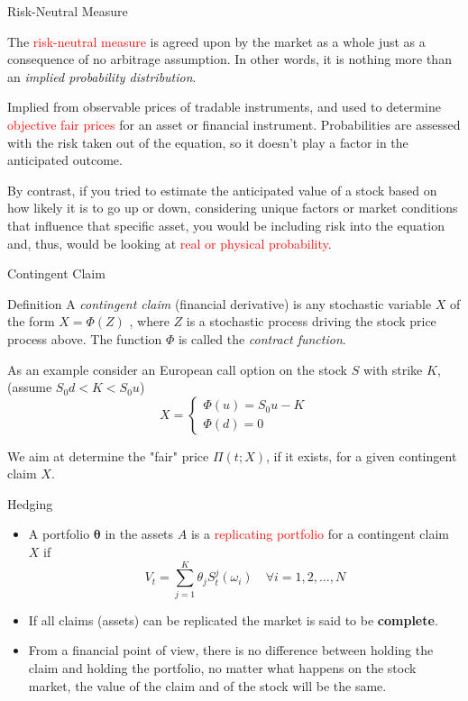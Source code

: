 \documentclass{beamer}
\begin{document}
\begin{frame}{Risk-Neutral Measure}

The \textcolor{red}{risk-neutral measure} is agreed upon by the market as a whole just as a consequence of no arbitrage assumption.
In other words, it is nothing more than an \emph{implied probability distribution}.

Implied from observable prices of tradable instruments, and used to determine \textcolor{red}{objective fair prices} for an asset or financial instrument. Probabilities are assessed with the risk taken out of the equation, so it doesn’t play a factor in the anticipated outcome.

By contrast, if you tried to estimate the anticipated value of a stock based on how likely it is to go up or down, considering unique factors or market conditions that influence that specific asset, you would be including risk into the equation and, thus, would be looking at \textcolor{red}{real or physical probability}.
\end{frame}

\begin{frame}{Contingent Claim}
	\begin{block}{Definition}
	A \emph{contingent claim} (financial derivative) is any stochastic variable $X$ of the form $X=\Phi(Z)$ , where $Z$ is a stochastic process driving the stock price process above. 
The function $\Phi$ is called the \emph{contract function}.
	\end{block}
	As an example consider an European call option on the stock $S$ with strike $K$, (assume $S_0d < K < S_0u$)
	\begin{equation*}
		X = \begin{cases}
			\Phi(u) = S_0 u - K\\
			\Phi(d) = 0
		\end{cases}
	\end{equation*}

	We aim at determine the "fair" price $\Pi(t; X)$, if it exists, for a given contingent claim $X$.
\end{frame}

\begin{frame}{Hedging}
	\begin{itemize}
		\item A portfolio $\mathbf{\theta}$ in the assets $A$ is a \textcolor{red}{replicating portfolio} for a contingent claim $X$ if
		\begin{equation}
			V_t = \sum_{j=1}^K \theta_j S_t^j(\omega_i)\quad\forall i=1,2,\ldots,N
		\end{equation}
	\item If all claims (assets) can be replicated the market is said to be \textbf{complete}.
	\item From a financial point of view, there is no difference between holding the claim and holding the portfolio, no matter what happens on the stock market, the value of the claim and of the stock will be the same.
	\end{itemize}
\end{frame}
\end{document}
